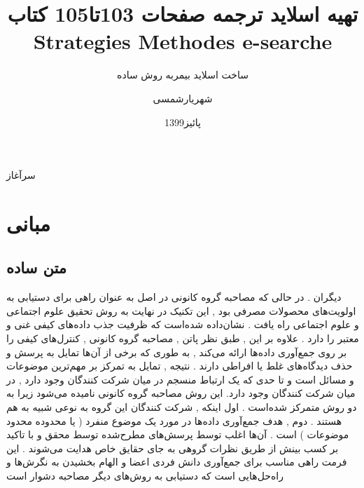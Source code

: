 \documentclass{beamer}
\title{
تهیه اسلاید ترجمه صفحات 103تا105 کتاب \\Strategies Methodes e-searche
}
\subtitle{ساخت اسلاید بیمربه روش ساده‌}
\author{شهریارشمسی }
\institute{دانشگاه پیام نور تهران شمال}
\date{پائیز1399}
\begin{document}
\begin{persian}
\begin{frame}
\maketitle
\end{frame}

\everypar{\rightskip\rightmargin}
\begin{frame}{سرآغاز}
\section{مبانی}
\subsection{متن ساده}
دیگران . در حالی که مصاحبه گروه کانونی در اصل به عنوان راهی برای دستیابی به اولویت‌های محصولات مصرفی بود , این تکنیک در نهایت به روش تحقیق علوم اجتماعی و علوم اجتماعی راه یافت . نشان‌داده شده‌است که ظرفیت جذب داده‌های کیفی غنی و معتبر را دارد . علاوه بر این , طبق نظر پاتن , مصاحبه گروه کانونی , کنترل‌های کیفی را بر روی جمع‌آوری داده‌ها ارائه می‌کند , به طوری که برخی از آن‌ها تمایل به پرسش و حذف دیدگاه‌های غلط یا افراطی دارند . نتیجه , تمایل به تمرکز بر مهم‌ترین موضوعات و مسائل است و تا حدی که یک ارتباط منسجم در میان شرکت کنندگان وجود دارد , در میان شرکت کنندگان وجود دارد.
این روش مصاحبه گروه کانونی نامیده می‌شود زیرا به دو روش متمرکز شده‌است . اول اینکه , شرکت کنندگان این گروه به نوعی شبیه به هم هستند . دوم , هدف جمع‌آوری داده‌ها در مورد یک موضوع منفرد ( یا محدوده محدود موضوعات ) است . آن‌ها اغلب توسط پرسش‌های مطرح‌شده توسط محقق و با تاکید بر کسب بینش از طریق نظرات گروهی به جای حقایق خاص هدایت می‌شوند . این فرمت راهی مناسب برای جمع‌آوری دانش فردی اعضا و الهام بخشیدن به نگرش‌ها و راه‌حل‌هایی است که دستیابی به روش‌های دیگر مصاحبه دشوار است 

\end{frame}
\end{persian}
\end{document}
